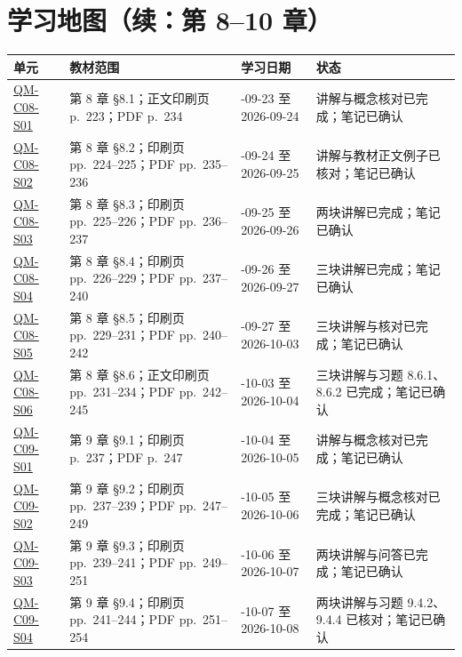 \clearpage
\section*{学习地图（续：第 8--10 章）}

\begin{center}
\footnotesize
\renewcommand{\arraystretch}{1.0}
\begin{tabularx}{\textwidth}{@{}>{\raggedright\arraybackslash}p{2.7cm}>{\raggedright\arraybackslash}p{4.1cm}>{\raggedright\arraybackslash}p{3.0cm}X@{}}
  \toprule
  单元 & 教材范围 & 学习日期 & 状态 \\
  \midrule
  \hyperref[section:QM-C08-S01]{QM-C08-S01} & 第 8 章 \S 8.1；正文印刷页 p.~223；PDF p.~234 & 2026-09-23 至 2026-09-24 & 讲解与概念核对已完成；笔记已确认 \\
  \hyperref[section:QM-C08-S02]{QM-C08-S02} & 第 8 章 \S 8.2；印刷页 pp.~224--225；PDF pp.~235--236 & 2026-09-24 至 2026-09-25 & 讲解与教材正文例子已核对；笔记已确认 \\
  \hyperref[section:QM-C08-S03]{QM-C08-S03} & 第 8 章 \S 8.3；印刷页 pp.~225--226；PDF pp.~236--237 & 2026-09-25 至 2026-09-26 & 两块讲解已完成；笔记已确认 \\
  \hyperref[section:QM-C08-S04]{QM-C08-S04} & 第 8 章 \S 8.4；印刷页 pp.~226--229；PDF pp.~237--240 & 2026-09-26 至 2026-09-27 & 三块讲解已完成；笔记已确认 \\
  \hyperref[section:QM-C08-S05]{QM-C08-S05} & 第 8 章 \S 8.5；印刷页 pp.~229--231；PDF pp.~240--242 & 2026-09-27 至 2026-10-03 & 三块讲解与核对已完成；笔记已确认 \\
  \hyperref[section:QM-C08-S06]{QM-C08-S06} & 第 8 章 \S 8.6；正文印刷页 pp.~231--234；PDF pp.~242--245 & 2026-10-03 至 2026-10-04 & 三块讲解与习题 8.6.1、8.6.2 已完成；笔记已确认 \\
  \hyperref[section:QM-C09-S01]{QM-C09-S01} & 第 9 章 \S 9.1；印刷页 p.~237；PDF p.~247 & 2026-10-04 至 2026-10-05 & 讲解与概念核对已完成；笔记已确认 \\
  \hyperref[section:QM-C09-S02]{QM-C09-S02} & 第 9 章 \S 9.2；印刷页 pp.~237--239；PDF pp.~247--249 & 2026-10-05 至 2026-10-06 & 三块讲解与概念核对已完成；笔记已确认 \\
  \hyperref[section:QM-C09-S03]{QM-C09-S03} & 第 9 章 \S 9.3；印刷页 pp.~239--241；PDF pp.~249--251 & 2026-10-06 至 2026-10-07 & 两块讲解与问答已完成；笔记已确认 \\
  \hyperref[section:QM-C09-S04]{QM-C09-S04} & 第 9 章 \S 9.4；印刷页 pp.~241--244；PDF pp.~251--254 & 2026-10-07 至 2026-10-08 & 两块讲解与习题 9.4.2、9.4.4 已核对；笔记已确认 \\

\end{tabularx}
\end{center}
